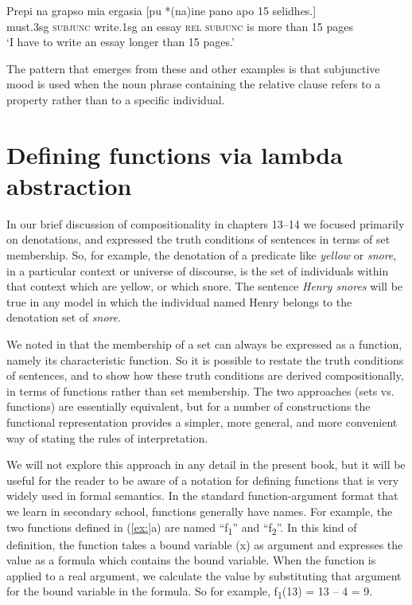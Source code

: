 \ea
\gll Prepi  na  grapso  mia  ergasia  [pu  *(na)\footnotemark  ine  pano  apo  15  selidhes.]\\
must.3sg  \textsc{subjunc}  write.1sg  an  essay  \textsc{rel}  \textsc{subjunc}  is  more  than  15  pages\\
\glt ‘I have to write an essay longer than 15 pages.’\\
\z
{}

The pattern that emerges from these and other examples is that subjunctive mood is used when the noun phrase containing the relative clause refers to a property rather than to a specific individual.


\section{Defining functions via lambda abstraction}\label{sec:15.6}

In our brief discussion of compositionality in chapters 13–14 we focused primarily on denotations, and expressed the truth conditions of sentences in terms of set membership. So, for example, the denotation of a predicate like \textit{yellow} or \textit{snore}, in a particular context or universe of discourse, is the set of individuals within that context which are yellow, or which snore. The sentence \textit{Henry snores} will be true in any model in which the individual named Henry belongs to the denotation set of \textit{snore}.



We noted in  that the membership of a set can always be expressed as a function, namely its characteristic function. So it is possible to restate the truth conditions of sentences, and to show how these truth conditions are derived compositionally, in terms of functions rather than set membership. The two approaches (sets vs. functions) are essentially equivalent, but for a number of constructions the functional representation provides a simpler, more general, and more convenient way of stating the rules of interpretation.



We will not explore this approach in any detail in the present book, but it will be useful for the reader to be aware of a notation for defining functions that is very widely used in formal semantics. In the standard function-argument format that we learn in secondary school, functions generally have names. For example, the two functions defined in (\ref{ex:}a) are named “f\textsubscript{1}” and “f\textsubscript{2}”. In this kind of definition, the function takes a bound variable (x) as argument and expresses the value as a formula which contains the bound variable. When the function is applied to a real argument, we calculate the value by substituting that argument for the bound variable in the formula. So for example, f\textsubscript{1}(13) = 13 – 4 = 9.


